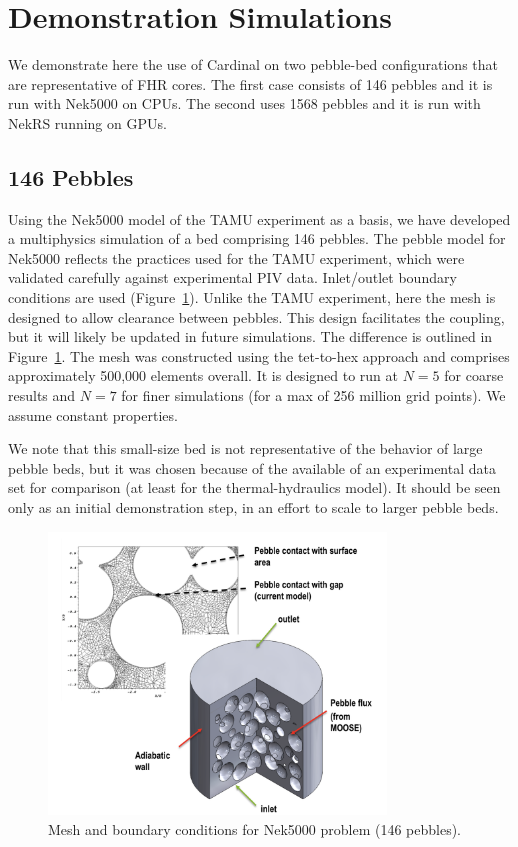 \section{Demonstration Simulations}
\label{s:demo}

We demonstrate here the use of Cardinal on two pebble-bed configurations
that are representative of FHR cores.  The first case consists of 146
pebbles and it is run with Nek5000 on CPUs. The second uses 1568 pebbles and it is run with NekRS running on GPUs.

\subsection{146 Pebbles}
\label{ss:c4}

Using the Nek5000 model of the TAMU experiment as a basis, we have developed a
multiphysics simulation of a bed comprising 146 pebbles.  The pebble model for
Nek5000 reflects the practices used for the TAMU experiment, which were
validated carefully against experimental PIV data. Inlet/outlet boundary
conditions are used (Figure~\ref{f:pb2}). Unlike the TAMU experiment, here the
mesh is designed to allow clearance between pebbles. This design facilitates
the coupling, but it will likely be updated in future simulations. The
difference is outlined in Figure~\ref{f:pb2}. The mesh was constructed
using the tet-to-hex approach and comprises approximately 500,000 elements
overall. It is designed to run at $N=5$ for coarse results and $N=7$ for
finer simulations (for a max of 256 million grid points). We
assume constant properties.

We note that this small-size bed is not representative of the behavior of large pebble beds,
but it was chosen because of the available of an experimental data set for comparison (at least for the thermal-hydraulics model). It should be seen only as an initial demonstration step, in an effort to scale to larger pebble beds.

\begin{figure}[!h]
\centering
\includegraphics[clip=true,width=0.8\textwidth]{Figures/pb_mesh}
\caption{Mesh and boundary conditions for Nek5000 problem (146 pebbles).}
\label{f:pb2}
\end{figure}

